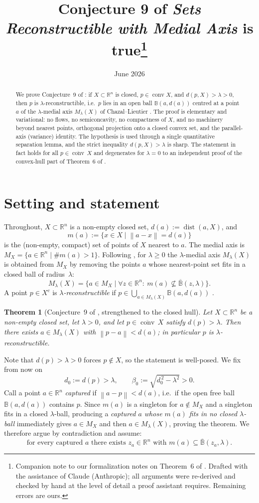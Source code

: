 \documentclass[11pt]{article}
\title{Conjecture 9 of \emph{Sets Reconstructible with Medial Axis} is true\thanks{Companion
note to our formalization notes on Theorem~6 of \cite{Bia}. Drafted with the assistance of
Claude (Anthropic); all arguments were re-derived and checked by hand at the level of detail a
proof assistant requires. Remaining errors are ours.}}
\author{}
\date{June 2026}
\newtheorem{theorem}{Theorem}[section]
\theoremstyle{remark}
\newcommand{\R}{\mathbb{R}}
\newcommand{\B}{\mathbb{B}}
\newcommand{\X}{X}
\newcommand{\conv}{\operatorname{conv}}
\newcommand{\cconv}[1]{\overline{\conv}\,#1}
\newcommand{\dist}{\operatorname{dist}}
\newcommand{\norm}[1]{\left\lVert #1\right\rVert}
\newcommand{\Mx}{M_{\X}}
\newcommand{\Ml}{M_{\lambda}(\X)}
\newcommand{\Bcl}[2]{\overline{\B}(#1,#2)}
\begin{document}
\maketitle

\begin{abstract}
We prove Conjecture~9 of \cite{Bia}: if $\X\subset\R^n$ is closed, $p\in\conv \X$, and
$d(p,\X)>\lambda>0$, then $p$ is $\lambda$-reconstructible, i.e.\ $p$ lies in an open ball
$\B(a,d(a))$ centred at a point $a$ of the $\lambda$-medial axis $\Ml$ of Chazal--Lieutier
\cite{CL}. The proof is elementary and variational: no flows, no semiconcavity, no
compactness of $\X$, and no machinery beyond nearest points, orthogonal projection onto a
closed convex set, and the parallel-axis (variance) identity. The hypothesis is used through
a single quantitative separation lemma, and the strict inequality $d(p,\X)>\lambda$ is sharp.
The statement in fact holds for all $p\in\cconv \X$ and degenerates for $\lambda=0$ to an
independent proof of the convex-hull part of Theorem~6 of \cite{Bia}.
\end{abstract}

\section{Setting and statement}

Throughout, $\X\subset\R^n$ is a non-empty closed set, $d(a):=\dist(a,\X)$, and
\[
m(a):=\{x\in \X \mid \norm{a-x}=d(a)\}
\]
is the (non-empty, compact) set of points of $\X$ nearest to $a$. The medial axis is
$\Mx=\{a\in\R^n\mid \#m(a)>1\}$. Following \cite{Bia,CL}, for $\lambda\ge 0$ the
$\lambda$-medial axis $\Ml$ is obtained from $\Mx$ by removing the points $a$ whose nearest-point
set fits in a closed ball of radius~$\lambda$:
\[
\Ml=\bigl\{a\in \Mx \;\big|\; \forall z\in\R^n:\ m(a)\not\subseteq \Bcl{z}{\lambda}\bigr\}.
\]
A point $p\in \X^{c}$ is \emph{$\lambda$-reconstructible} if
$p\in\bigcup_{a\in \Ml}\B(a,d(a))$ \cite[Def.~5]{Bia}.

\begin{theorem}[Conjecture~9 of \cite{Bia}, strengthened to the closed hull]\label{thm:main}
Let $\X\subset\R^n$ be a non-empty closed set, let $\lambda>0$, and let
$p\in\cconv\X$ satisfy $d(p)>\lambda$. Then there exists $a\in \Ml$ with
$\norm{p-a}<d(a)$; in particular $p$ is $\lambda$-reconstructible.
\end{theorem}

Note that $d(p)>\lambda>0$ forces $p\notin \X$, so the statement is well-posed. We fix from now on
\[
d_0:=d(p)>\lambda,
\qquad
\beta_0:=\sqrt{d_0^{\,2}-\lambda^2}>0 .
\]
Call a point $a\in\R^n$ \emph{captured} if $\norm{a-p}<d(a)$, i.e.\ if the open free ball
$\B(a,d(a))$ contains $p$. Since $m(a)$ is a singleton for $a\notin\Mx$ and a singleton fits in a
closed $\lambda$-ball, producing a \emph{captured $a$ whose $m(a)$ fits in no closed
$\lambda$-ball} immediately gives $a\in\Mx$ and then $a\in\Ml$, proving the theorem. We therefore
argue by contradiction and assume:
\begin{equation}\label{eq:H}\tag{H}
\text{for every captured } a \text{ there exists } z_a\in\R^n \text{ with } m(a)\subseteq
\Bcl{z_a}{\lambda}.
\end{equation}
\end{document}
